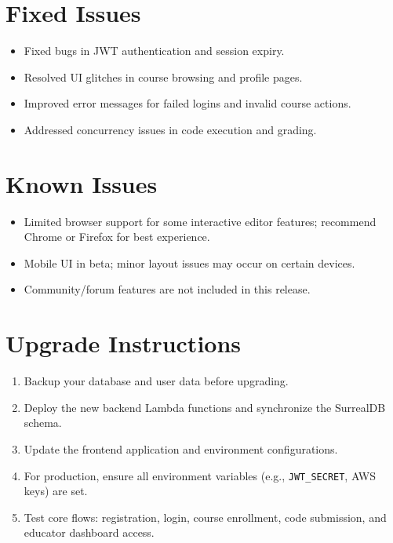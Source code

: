 \documentclass[a4paper,11pt]{scrartcl}
\begin{document}
\section{Fixed Issues}

\begin{itemize}[leftmargin=*]
    \item Fixed bugs in JWT authentication and session expiry.
    \item Resolved UI glitches in course browsing and profile pages.
    \item Improved error messages for failed logins and invalid course actions.
    \item Addressed concurrency issues in code execution and grading.
\end{itemize}

\section{Known Issues}

\begin{itemize}[leftmargin=*]
    \item Limited browser support for some interactive editor features; recommend Chrome or Firefox for best experience.
    \item Mobile UI in beta; minor layout issues may occur on certain devices.
    \item Community/forum features are not included in this release.
\end{itemize}

\section{Upgrade Instructions}

\begin{enumerate}[leftmargin=*]
    \item Backup your database and user data before upgrading.
    \item Deploy the new backend Lambda functions and synchronize the SurrealDB schema.
    \item Update the frontend application and environment configurations.
    \item For production, ensure all environment variables (e.g., \texttt{JWT\_SECRET}, AWS keys) are set.
    \item Test core flows: registration, login, course enrollment, code submission, and educator dashboard access.
\end{enumerate}
\end{document}
